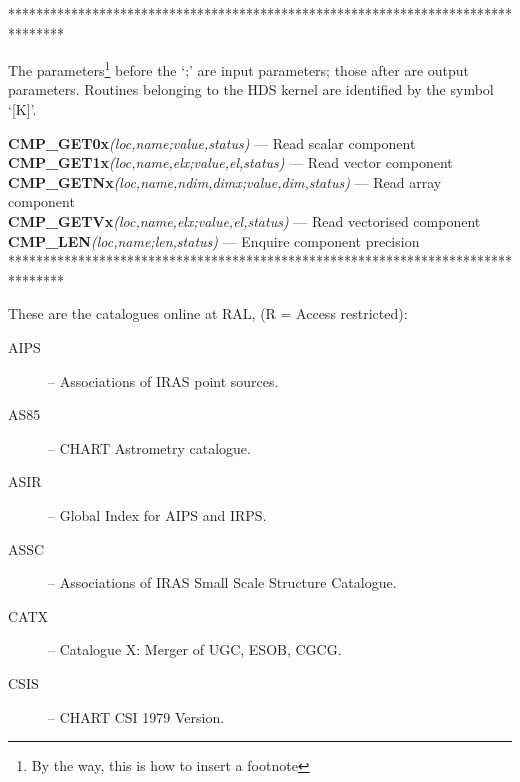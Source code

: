 ********************************************************************************

The parameters\footnote{By the way, this is how to insert a footnote} before
the `;' are input parameters; those after are output parameters.
Routines belonging to the HDS kernel are identified by the symbol `[K]'.

\noindent
{\bf CMP\_GET0x}{\em (loc,name;value,status)} --- Read scalar component\\
{\bf CMP\_GET1x}{\em (loc,name,elx;value,el,status)} --- Read vector component\\
{\bf CMP\_GETNx}{\em (loc,name,ndim,dimx;value,dim,status)} --- Read array component\\
{\bf CMP\_GETVx}{\em (loc,name,elx;value,el,status)} --- Read vectorised component\\
{\bf CMP\_LEN}{\em (loc,name;len,status)} --- Enquire component precision\\

********************************************************************************

These are the catalogues online at RAL, (R = Access restricted):
\begin{description}
\item [AIPS] -- Associations of IRAS point sources.
\item [AS85] -- CHART Astrometry catalogue.
\item [ASIR] -- Global Index for AIPS and IRPS.
\item [ASSC] -- Associations of IRAS Small Scale Structure Catalogue.
\item [CATX] -- Catalogue X: Merger of UGC, ESOB, CGCG.
\item [CSIS] -- CHART CSI 1979 Version.
\end{description}

\newpage

